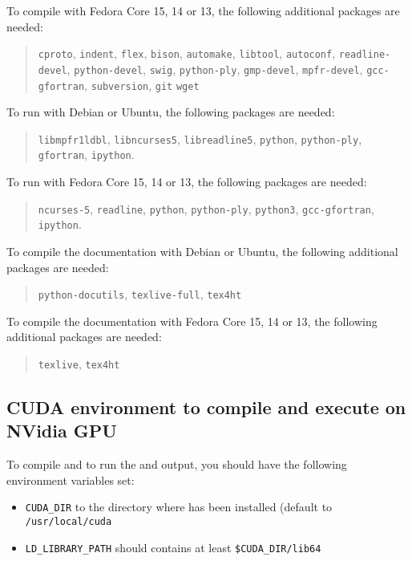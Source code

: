 \documentclass[a4paper]{article}
\begin{document}
To compile \Apfa with Fedora Core 15, 14 or 13, the following additional
packages are needed:
\begin{quote}
  \texttt{cproto}, \texttt{indent}, \texttt{flex}, \texttt{bison},
  \texttt{automake}, \texttt{libtool}, \texttt{autoconf},
  \texttt{readline-devel}, \texttt{python-devel}, \texttt{swig},
  \texttt{python-ply}, \texttt{gmp-devel},
  \texttt{mpfr-devel}, \texttt{gcc-gfortran}, \texttt{subversion},
  \texttt{git} \texttt{wget}
\end{quote}


To run \Apfa with Debian or Ubuntu, the following packages are needed:
\begin{quote}
  \texttt{libmpfr1ldbl},
  \texttt{libncurses5}, \texttt{libreadline5}, \texttt{python},
  \texttt{python-ply}, \texttt{gfortran},
  \texttt{ipython}.
\end{quote}

To run \Apfa with Fedora Core 15, 14 or 13, the following packages are needed:
\begin{quote}
  \texttt{ncurses-5}, \texttt{readline}, \texttt{python},
  \texttt{python-ply}, \texttt{python3}, \texttt{gcc-gfortran},
  \texttt{ipython}.
\end{quote}

To compile the documentation with Debian or Ubuntu, the following
additional packages are needed:
\begin{quote}
  \texttt{python-docutils}, \texttt{texlive-full}, \texttt{tex4ht}
\end{quote}

To compile the documentation with Fedora Core 15, 14 or 13, the following
additional packages are needed:
\begin{quote}
  \texttt{texlive}, \texttt{tex4ht}
\end{quote}

\subsection{CUDA environment to compile and execute on NVidia GPU}

To compile and to run the \Acuda and \Aopencl output, you should have the following
environment variables set:
\begin{itemize}
\item \verb|CUDA_DIR| to the directory where \Acuda has been installed (default to
  \texttt{/usr/local/cuda}
\item \verb|LD_LIBRARY_PATH| should contains at least \verb|$CUDA_DIR/lib64|
\end{itemize}
\end{document}
